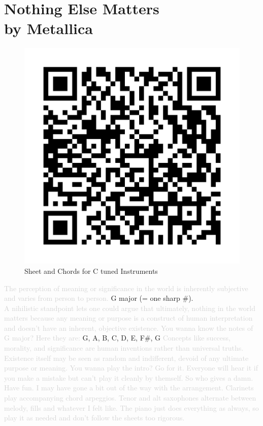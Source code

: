 \chapter[Nothing Else Matters]{Nothing Else Matters\\[1ex]\large{by Metallica}}
\begin{figure}
\includegraphics[width=1\linewidth]{QR_Codes/QR_NothingElseMatters_C.png}\\
Sheet and Chords for C tuned Instruments
\end{figure}

\textcolor{lightgray}{The perception of meaning or significance in the world is inherently subjective and varies from person to person. } G major (= one sharp $\#$).\\
\textcolor{lightgray}{A nihilistic standpoint lets one could argue that ultimately, nothing in the world matters because any meaning or purpose is a construct of human interpretation and doesn't have an inherent, objective existence. You wanna know the notes of G major? Here they are:} G, A, B, C, D, E, F$\#$, G \textcolor{lightgray}{Concepts like success, morality, and significance are human inventions rather than universal truths. Existence itself may be seen as random and indifferent, devoid of any ultimate purpose or meaning. You wanna play the intro? Go for it. Everyone will hear it if you make a mistake but can't play it cleanly by themself. So who gives a damn. Have fun. I may have gone a bit out of the way with the arrangement. Clarinets play accompanying chord arpeggios. Tenor and alt saxophones alternate between melody, fills and whatever I felt like. The piano just does everything as always, so play it as needed and don't follow the sheets too rigorous.}

